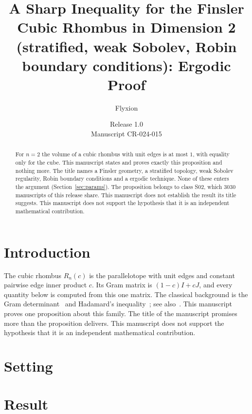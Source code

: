\documentclass[11pt]{article}
\title{A Sharp Inequality for the Finsler Cubic Rhombus in Dimension 2 (stratified, weak Sobolev, Robin boundary conditions): Ergodic Proof}
\author{Flyxion}
\date{Release 1.0\\ Manuscript CR-024-015}
\begin{document}
\maketitle
\begin{abstract}
For $n=2$ the volume of a cubic rhombus with unit edges is at most $1$, with equality only for the cube. This manuscript states and proves exactly this proposition and nothing more. The title names a Finsler geometry, a stratified topology, weak Sobolev regularity, Robin boundary conditions and a ergodic technique. None of these enters the argument (Section~\ref{sec:params}). The proposition belongs to class S02, which 3030 manuscripts of this release share. This manuscript does not establish the result its title suggests. This manuscript does not support the hypothesis that it is an independent mathematical contribution.
\end{abstract}

\section{Introduction}
The cubic rhombus $R_n(c)$ is the parallelotope with unit edges and constant pairwise edge inner product $c$. Its Gram matrix is $(1-c)I+cJ$, and every quantity below is computed from this one matrix. The classical background is the Gram determinant~\cite{gram} and Hadamard's inequality~\cite{hadamard}; see also~\cite{hj}.
This manuscript proves one proposition about this family. The title of the manuscript promises more than the proposition delivers. This manuscript does not support the hypothesis that it is an independent mathematical contribution.

\section{Setting}


\section{Result}

\end{document}
